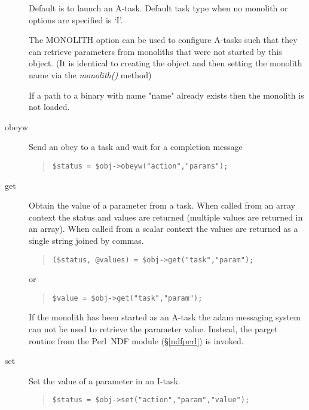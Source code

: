 \documentclass[twoside,11pt]{article}
\newenvironment{myquote}{\begin{quote}\begin{small}}{\end{small}\end{quote}}
\newcommand{\perl}{\xref{\textsf{Perl}}{sun193}{}}
\newcommand{\xref}[3]{#1}
\renewcommand{\_}{\texttt{\symbol{95}}}
\begin{document}
\begin{description}
Default is to launch an A-task. Default task type when no monolith
or options are specified is `I'.

The MONOLITH option can be used to configure A-tasks such that 
they can retrieve parameters from monoliths that were not started by this 
object. (It is identical to creating the object and then setting the
monolith name via the {\em monolith()\/} method)

If a path to a binary with name "name" already exists then the monolith
is not loaded.

\item[obeyw] \mbox{}

Send an obey to a task and wait for a completion message
\begin{myquote}
\begin{verbatim}
$status = $obj->obeyw("action","params");
\end{verbatim}
\end{myquote}

\item[get] \mbox{}

Obtain the value of a parameter from a task. 
When called from an array context the status and values are returned
(multiple values are returned in an array). When called from a scalar
context the values are returned as a single string joined by commas.

\begin{myquote}
\begin{verbatim}
($status, @values) = $obj->get("task","param");
\end{verbatim}
\end{myquote}
or
\begin{myquote}
\begin{verbatim}
$value = $obj->get("task","param");
\end{verbatim}
\end{myquote}

If the monolith has been started as an A-task the adam messaging
system can not be used to retrieve the parameter value. Instead,
the par\_{}get routine from the \perl\ NDF module (\S\ref{ndfperl}) is invoked.

\item[set] \mbox{}


Set the value of a parameter in an I-task.
\begin{myquote}
\begin{verbatim}
$status = $obj->set("action","param","value");
\end{verbatim}
\end{myquote}


\end{description}
\end{document}
